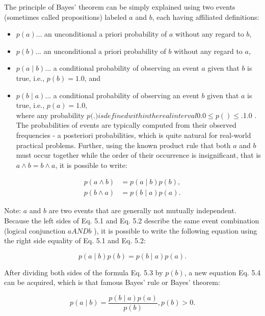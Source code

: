 \documentclass[11pt,openany,executivepaper]{book}
\begin{document}
The principle of Bayes' theorem can be simply explained using two events (sometimes called propositions) labeled $a$ and $b$, each having affiliated definitions:

\begin{itemize}
  \item $p(a) \ldots$ an unconditional a priori probability of $a$ without any regard to $b$,
  \item $p(b) \ldots$ an unconditional a priori probability of $b$ without any regard to $a$,
  \item $p(a \mid b) \ldots$ a conditional probability of observing an event $a$ given that $b$ is true, i.e., $p(b)=1.0$, and
  \item $p(b \mid a) \ldots$ a conditional probability of observing an event $b$ given that $a$ is true, i.e., $p(a)=1.0$,\\
where any probability $p($.$) is defined within the real interval 0.0 \leq p() \leq$.1.0 . The probabilities of events are typically computed from their observed frequencies - a posteriori probabilities, which is quite natural for real-world practical problems. Further, using the known product rule that both $a$ and $b$ must occur together while the order of their occurrence is insignificant, that is $a \wedge b=b \wedge a$, it is possible to write:
\end{itemize}


\begin{align*}
p(a \wedge b) & =p(a \mid b) p(b),  \tag{5.1}\\
p(b \wedge a) & =p(b \mid a) p(a) . \tag{5.2}
\end{align*}


Note: $a$ and $b$ are two events that are generally not mutually independent.\\
Because the left sides of Eq. 5.1 and Eq. 5.2 describe the same event combination (logical conjunction $a A N D b$ ), it is possible to write the following equation using the right side equality of Eq. 5.1 and Eq. 5.2:


\begin{equation*}
p(a \mid b) p(b)=p(b \mid a) p(a) . \tag{5.3}
\end{equation*}


After dividing both sides of the formula Eq. 5.3 by $p(b)$, a new equation Eq. 5.4 can be acquired, which is that famous Bayes' rule or Bayes' theorem:


\begin{equation*}
p(a \mid b)=\frac{p(b \mid a) p(a)}{p(b)}, p(b)>0 . \tag{5.4}
\end{equation*}
\end{document}
